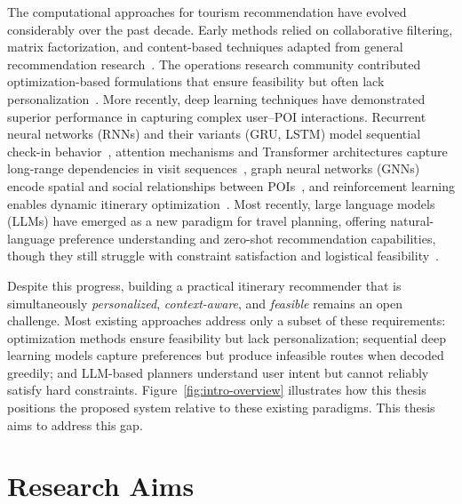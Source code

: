 
The computational approaches for tourism recommendation have evolved considerably over the past decade. Early methods relied on collaborative filtering, matrix factorization, and content-based techniques adapted from general recommendation research~\cite{koren2009mf, burke2002hybrid}. The operations research community contributed optimization-based formulations that ensure feasibility but often lack personalization~\cite{vansteenwegen2011op, gavalas2014ttdp}. More recently, deep learning techniques have demonstrated superior performance in capturing complex user--POI interactions. Recurrent neural networks (RNNs) and their variants (GRU, LSTM) model sequential check-in behavior~\cite{liu2016strnn}, attention mechanisms and Transformer architectures capture long-range dependencies in visit sequences~\cite{sun2019bert4rec, kang2018sasrec}, graph neural networks (GNNs) encode spatial and social relationships between POIs~\cite{gnnpoi2024survey}, and reinforcement learning enables dynamic itinerary optimization~\cite{halder2022thesis, halder2025drlir}. Most recently, large language models (LLMs) have emerged as a new paradigm for travel planning, offering natural-language preference understanding and zero-shot recommendation capabilities, though they still struggle with constraint satisfaction and logistical feasibility~\cite{xie2024travelplanning, fan2024travelagent}.

Despite this progress, building a practical itinerary recommender that is simultaneously \emph{personalized}, \emph{context-aware}, and \emph{feasible} remains an open challenge. Most existing approaches address only a subset of these requirements: optimization methods ensure feasibility but lack personalization; sequential deep learning models capture preferences but produce infeasible routes when decoded greedily; and LLM-based planners understand user intent but cannot reliably satisfy hard constraints. Figure~\ref{fig:intro-overview} illustrates how this thesis positions the proposed system relative to these existing paradigms. This thesis aims to address this gap.




\section{Research Aims}
\label{sec:intro-aims}

